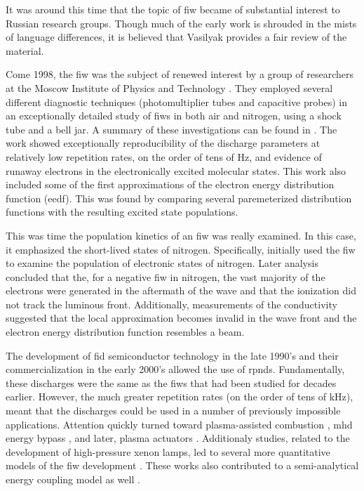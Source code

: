 It was around this time that the topic of fiw became of substantial interest to
Russian research groups. Though much of the early work is shrouded in the mists
of language differences, it is believed that Vasilyak \cite{Vasilyak1994}
provides a fair review of the material. 

Come 1998, the fiw was the subject of renewed interest by a group of researchers
at the Moscow Institute of Physics and Technology \cite{Anikin1998}. They
employed several different diagnostic techniques (photomultiplier tubes and
capacitive probes) in an exceptionally detailed study of fiws in both air and
nitrogen, using a shock tube and a bell jar. A summary of these investigations
can be found in \cite{Starikovskaia2001}. The work showed exceptionally
reproducibility of the discharge parameters at relatively low repetition rates,
on the order of tens of Hz, and evidence of runaway electrons in the
electronically excited molecular states. This work also included some of the
first approximations of the electron energy distribution function (\acs{eedf}).
This was found by comparing several paremeterized distribution functions with
the resulting excited state populations. 

This was time the population kinetics of an fiw was really examined. In this
case, it emphasized the short-lived states of nitrogen. Specifically,
\cite{Pancheshnyi1998} initially used the fiw to examine the population of
electronic states of nitrogen. Later analysis \cite{Pancheshnyi1999} concluded
that the, for a negative fiw in nitrogen, the vast majority of the electrons
were generated in the aftermath of the wave and that the ionization did not
track the luminous front. Additionally, measurements of the conductivity
suggested that the local approximation becomes invalid in the wave front and the
electron energy distribution function resembles a beam.

The development of fid semiconductor technology in the late 1990's and their
commercialization in the early 2000's allowed the use of rpnds. Fundamentally,
these discharges were the same as the fiws that had been studied for decades
earlier. However, the much greater repetition rates (on the order of tens of
kHz), meant that the discharges could be used in a number of previously
impossible applications. Attention quickly turned toward plasma-assisted
combustion \cite{Starikovskaia2006}, mhd energy bypass \cite{Macheret2002}, and
later, plasma actuators \cite{Adamovich2009}. Additionaly studies, related to
the development of high-pressure xenon lamps, led to several more quantitative
models of the fiw development \cite{Nikandrov2008, Tsendin2009}. These works
also contributed to a semi-analytical energy coupling model as well
\cite{Adamovich2009}.

